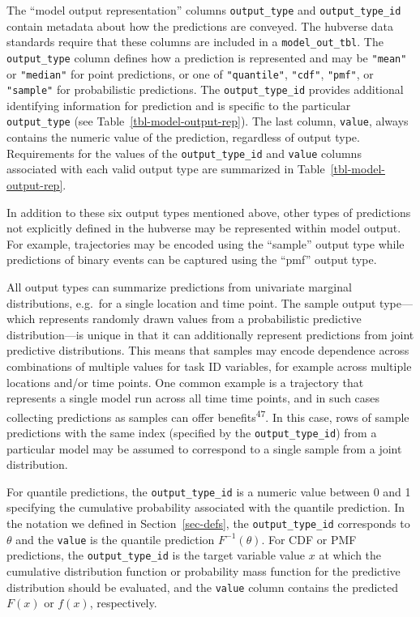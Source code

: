 \documentclass[
]{article}
\begin{document}
The ``model output representation'' columns \texttt{output\_type} and
\texttt{output\_type\_id} contain metadata about how the predictions are
conveyed. The hubverse data standards require that these columns are
included in a \texttt{model\_out\_tbl}. The \texttt{output\_type} column
defines how a prediction is represented and may be \texttt{"mean"} or
\texttt{"median"} for point predictions, or one of \texttt{"quantile"},
\texttt{"cdf"}, \texttt{"pmf"}, or \texttt{"sample"} for probabilistic
predictions. The \texttt{output\_type\_id} provides additional
identifying information for prediction and is specific to the particular
\texttt{output\_type} (see Table~\ref{tbl-model-output-rep}). The last
column, \texttt{value}, always contains the numeric value of the
prediction, regardless of output type. Requirements for the values of
the \texttt{output\_type\_id} and \texttt{value} columns associated with
each valid output type are summarized in
Table~\ref{tbl-model-output-rep}.

In addition to these six output types mentioned above, other types of
predictions not explicitly defined in the hubverse may be represented
within model output. For example, trajectories may be encoded using the
``sample'' output type while predictions of binary events can be
captured using the ``pmf'' output type.

All output types can summarize predictions from univariate marginal
distributions, e.g.~for a single location and time point. The sample
output type---which represents randomly drawn values from a
probabilistic predictive distribution---is unique in that it can
additionally represent predictions from joint predictive distributions.
This means that samples may encode dependence across combinations of
multiple values for task ID variables, for example across multiple
locations and/or time points. One common example is a trajectory that
represents a single model run across all time time points, and in such
cases collecting predictions as samples can offer
benefits\textsuperscript{47}. In this case, rows of sample predictions
with the same index (specified by the \texttt{output\_type\_id}) from a
particular model may be assumed to correspond to a single sample from a
joint distribution.

For quantile predictions, the \texttt{output\_type\_id} is a numeric
value between 0 and 1 specifying the cumulative probability associated
with the quantile prediction. In the notation we defined in
Section~\ref{sec-defs}, the \texttt{output\_type\_id} corresponds to
\(\theta\) and the \texttt{value} is the quantile prediction
\(F^{-1}(\theta)\). For CDF or PMF predictions, the
\texttt{output\_type\_id} is the target variable value \(x\) at which
the cumulative distribution function or probability mass function for
the predictive distribution should be evaluated, and the \texttt{value}
column contains the predicted \(F(x)\) or \(f(x)\), respectively.
\end{document}
